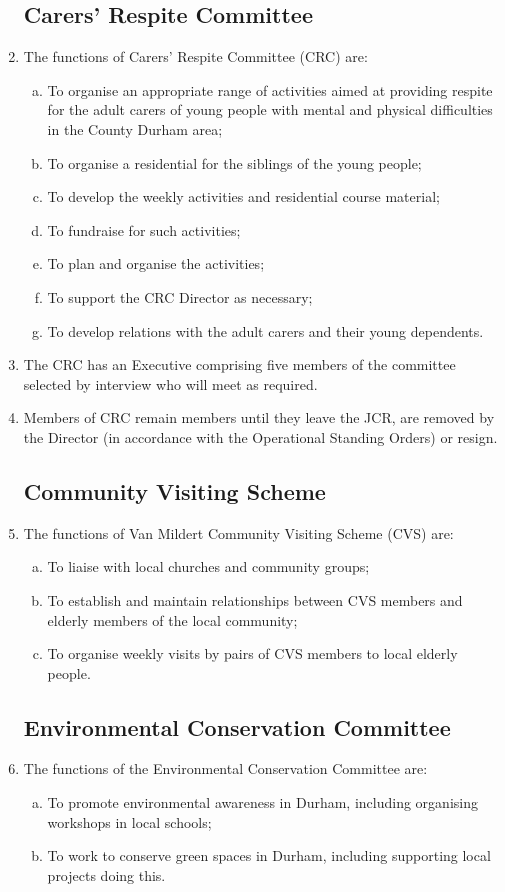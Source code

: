 \documentclass[12pt]{article}  %
\begin{document}
\begin{enumerate}
    \subsection{Carers’ Respite Committee}
    \item The functions of Carers’ Respite Committee (CRC) are:
    \begin{enumerate}[(a)]
        \item To organise an appropriate range of activities aimed at providing respite for the adult carers of young people with mental and physical difficulties in the County Durham area;
        \item To organise a residential for the siblings of the young people;
        \item To develop the weekly activities and residential course material;
        \item To fundraise for such activities;
        \item To plan and organise the activities;
        \item To support the CRC Director as necessary;
        \item To develop relations with the adult carers and their young dependents.
    \end{enumerate}
    \item The CRC has an Executive comprising five members of the committee selected by interview who will meet as required.
    \item Members of CRC remain members until they leave the JCR, are removed by the Director (in accordance with the Operational Standing Orders) or resign. 
    \subsection{Community Visiting Scheme}
    \item The functions of Van Mildert Community Visiting Scheme (CVS) are:
    \begin{enumerate}[(a)]
        \item To liaise with local churches and community groups;
        \item To establish and maintain relationships between CVS members and elderly members of the local community;
        \item To organise weekly visits by pairs of CVS members to local elderly people.
    \end{enumerate}
    \subsection{Environmental Conservation Committee}
    \item The functions of the Environmental Conservation Committee are:
    \begin{enumerate}[(a)]
        \item To promote environmental awareness in Durham, including organising workshops in local schools;
        \item To work to conserve green spaces in Durham, including supporting local projects doing this.
    \end{enumerate}

\end{enumerate}
\end{document}
